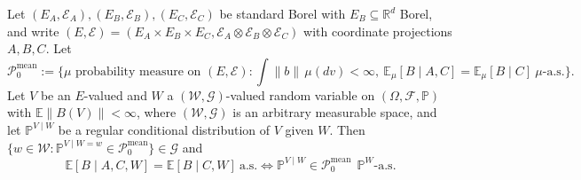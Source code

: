 \documentclass[twoside,11pt]{article}
\begin{document}
\begin{lemma}\label{lem:disint-mean}
Let $(E_A,\mathcal E_A),(E_B,\mathcal E_B),(E_C,\mathcal E_C)$ be standard Borel with
$E_B\subseteq\mathbb R^{d}$ Borel, and write
$(E,\mathcal E)=(E_A\times E_B\times E_C,\mathcal E_A\otimes\mathcal E_B\otimes\mathcal E_C)$
with coordinate projections $A,B,C$. Let
\[
  \mathcal P_0^{\mathrm{mean}}:=\Big\{\mu \text{ probability measure on } (E,\mathcal E):
  \int\|b\|\,\mu(dv)<\infty,\
  \mathbb E_\mu[B\mid A,C]=\mathbb E_\mu[B\mid C]\ \mu\text{-a.s.}\Big\}.
\]
Let $V$ be an $E$-valued and $W$ a $(\mathcal W,\mathcal G)$-valued random variable on
$(\Omega,\mathcal F,\mathbb P)$ with $\mathbb E\|B(V)\|<\infty$, where $(\mathcal W,\mathcal G)$
is an arbitrary measurable space, and let $\mathbb P^{V\mid W}$ be a regular conditional
distribution of $V$ given $W$. Then
$\{w\in\mathcal W:\mathbb P^{V\mid W=w}\in\mathcal P_0^{\mathrm{mean}}\}\in\mathcal G$ and
\[
  \mathbb E[B\mid A,C,W]=\mathbb E[B\mid C,W]\ \text{a.s.}
  \iff
  \mathbb P^{V\mid W}\in\mathcal P_0^{\mathrm{mean}}\ \ \mathbb P^{W}\text{-a.s.}
\]
\end{lemma}
\end{document}
